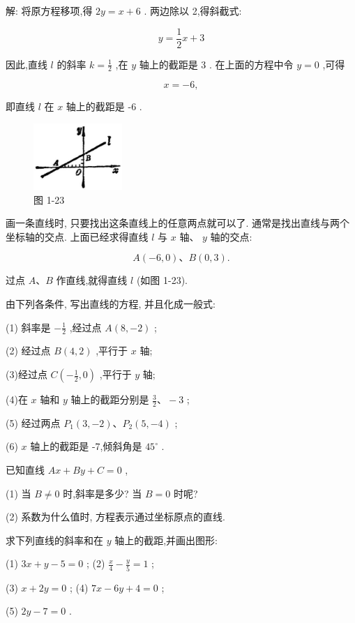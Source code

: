 \documentclass[lang=cn,newtx,10pt,scheme=chinese]{elegantbook}
\begin{document}
解: 将原方程移项,得 \({2y} = x + 6\) . 两边除以 2,得斜截式:

\[
  y = \frac{1}{2}x + 3
\]

因此,直线 \(l\) 的斜率 \(k = \frac{1}{2}\) ,在 \(y\) 轴上的截距是 3 . 在上面的方程中令 \(y = 0\) ,可得

\[
  x = - 6,
\]

即直线 \(l\) 在 \(x\) 轴上的截距是 -6 .

\begin{figure}[h]
  \centering
  \includegraphics[max width=0.3\textwidth]{images/01912cc2-ffb6-728e-9ae7-b113ff05c64b_30_525610.jpg}
  \caption{图 1-23}
\end{figure}



画一条直线时, 只要找出这条直线上的任意两点就可以了. 通常是找出直线与两个坐标轴的交点. 上面已经求得直线 \(l\) 与 \(x\) 轴、 \(y\) 轴的交点:

\[
  A\left( {-6,0}\right) \text{、}B\left( {0,3}\right) \text{.}
\]

过点 \(A\text{、}B\) 作直线,就得直线 \(l\) (如图 1-23).

\begin{problemset}[练习]

\item 由下列各条件, 写出直线的方程, 并且化成一般式:

(1) 斜率是 \(- \frac{1}{2}\) ,经过点 \(A\left( {8, - 2}\right)\) ;

(2) 经过点 \(B\left( {4,2}\right)\) ,平行于 \(x\) 轴;

(3)经过点 \(C\left( {-\frac{1}{2},0}\right)\) ,平行于 \(y\) 轴;

(4)在 \(x\) 轴和 \(y\) 轴上的截距分别是 \(\frac{3}{2}\text{、} - 3\) ;

(5) 经过两点 \({P}_{1}\left( {3, - 2}\right) \text{、}{P}_{2}\left( {5, - 4}\right)\) ;

(6) \(x\) 轴上的截距是 -7,倾斜角是 \({45}^{ \circ }\) .

\item 已知直线 \({Ax} + {By} + C = 0\) ,

(1) 当 \(B \neq 0\) 时,斜率是多少? 当 \(B = 0\) 时呢?

(2) 系数为什么值时, 方程表示通过坐标原点的直线.

\item 求下列直线的斜率和在 \(y\) 轴上的截距,并画出图形:

(1) \({3x} + y - 5 = 0\) ; (2) \(\frac{x}{4} - \frac{y}{5} = 1\) ;

(3) \(x + {2y} = 0\) ; (4) \({7x} - {6y} + 4 = 0\) ;

(5) \({2y} - 7 = 0\) .

\end{problemset}
\end{document}
